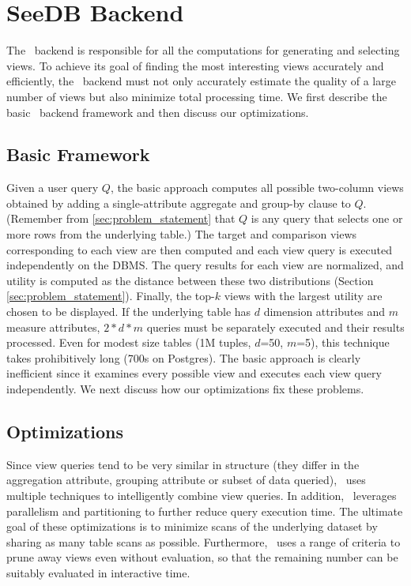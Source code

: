 
\section{SeeDB Backend}
\label{subsec:seedb_backend}

The \SeeDB\ backend is responsible for all the computations for 
generating and selecting views. 
To achieve its goal of finding the most
interesting views accurately and efficiently, the \SeeDB\ backend must not only accurately
estimate the quality of a large number of views but also minimize total processing time.
We first describe the basic \SeeDB\ backend framework and then discuss our optimizations.




\subsection{Basic Framework}
\label{sec:basic_framework}
Given a user query $Q$, the basic approach computes all possible two-column
views obtained by adding a single-attribute aggregate and group-by clause to
$Q$. (Remember from \ref{sec:problem_statement} that $Q$ is any query that
selects one or more rows from the underlying table.) 
The target and comparison
views corresponding to each view are then computed and each view query is
executed independently on the DBMS. The query results for each view are
normalized, and utility is computed as the distance between these two
distributions (Section \ref{sec:problem_statement}).
Finally, the top-$k$ views with the largest utility are chosen to be displayed.
If the underlying table has $d$ dimension attributes and $m$ measure attributes,
$2\ast d \ast m$ queries must be separately executed and their results
processed. Even for modest size tables (1M tuples, $d$=50, $m$=5), this
technique takes prohibitively long (700s on Postgres). The basic approach is
clearly inefficient since it examines every possible view and executes each view
query independently. We next discuss how our optimizations fix these problems. 









\subsection{Optimizations} \label{sec:optimizations}
Since view queries tend to be very similar in structure (they differ in the aggregation attribute,
grouping attribute or subset of data queried), \SeeDB\ uses multiple techniques
to intelligently combine view queries. In addition, \SeeDB\ leverages
parallelism and partitioning to further reduce query execution time. The
ultimate goal of these optimizations is to minimize scans of the underlying
dataset by sharing as many table scans as possible. 
Furthermore, \SeeDB\ uses a range of criteria to prune away views even without evaluation,
so that the remaining number can be suitably evaluated in interactive time. 

